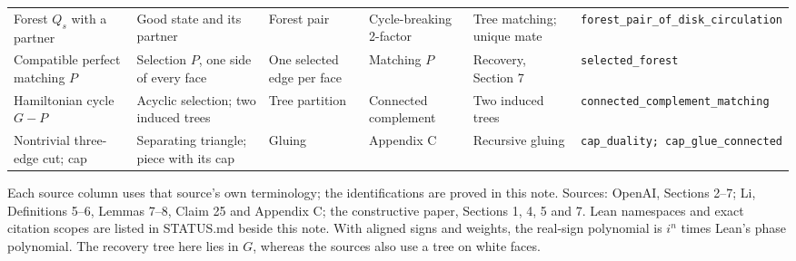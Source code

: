 \documentclass[a4paper,11pt]{amsart}
\begin{document}
\begin{tabularx}{\textwidth}{@{}*{6}{>{\raggedright\arraybackslash}X}@{}}
Forest $Q_s$ with a partner & Good state and its partner & Forest pair & Cycle-breaking 2-factor & Tree matching; unique mate & \nolinkurl{forest_pair_of_disk_circulation}\\
Compatible perfect matching $P$ & Selection $P$, one side of every face & One selected edge per face & Matching $P$ & Recovery, Section 7 & \nolinkurl{selected_forest}\\
Hamiltonian cycle $G-P$ & Acyclic selection; two induced trees & Tree partition & Connected complement & Two induced trees & \nolinkurl{connected_complement_matching}\\
Nontrivial three-edge cut; cap & Separating triangle; piece with its cap & Gluing & Appendix C & Recursive gluing & \nolinkurl{cap_duality; cap_glue_connected}\\
\bottomrule\end{tabularx}\par\endgroup
\medskip
Each source column uses that source's own terminology; the identifications are proved in this note. Sources: OpenAI, Sections 2--7; Li, Definitions 5--6, Lemmas 7--8, Claim 25 and Appendix C; the constructive paper, Sections 1, 4, 5 and 7. Lean namespaces and exact citation scopes are listed in STATUS.md beside this note. With aligned signs and weights, the real-sign polynomial is $i^n$ times Lean's phase polynomial. The recovery tree here lies in $G$, whereas the sources also use a tree on white faces.
\end{document}
